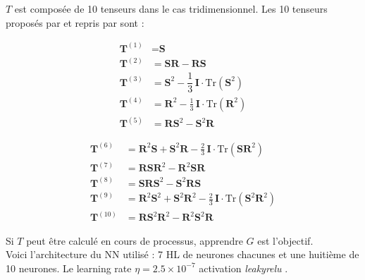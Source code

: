 \documentclass[a4paper,12pt]{report}
\newcommand\bk{\color{black}}
\newcommand\navy{\color{navy}}
\numberwithin{equation}{section} %
\begin{document}
\noindent $T$ est composée de 10 tenseurs dans le cas tridimensionnel. Les 10 tenseurs proposés par \cite{pope1975more} et repris par \cite{ling2016reynolds} sont : \setlength{\columnseprule}{0pt}
\\
\vspace{-6mm}
\begin{multicols}{2}

\begin{align*}
\textbf{T}^{(1)} &= \textbf{S} \\
\textbf{T}^{(2)} &= \textbf{S}\textbf{R} - \textbf{R}\textbf{S} \\
\textbf{T}^{(3)} &= \textbf{S}^2 - \dfrac{1}{3}\, \textbf{I} \cdot \text{Tr} \left( \textbf{S}^2 \right)\\
\textbf{T}^{(4)} &= \textbf{R}^2 - \frac{1}{3}\, \textbf{I} \cdot \text{Tr} \left( \textbf{R}^2 \right)\\
\textbf{T}^{(5)} &= \textbf{R}\textbf{S}^2 - \textbf{S}^2\textbf{R}
\end{align*}

\columnbreak

\begin{align*}
\textbf{T}^{(6)} &= \textbf{R}^2\textbf{S} + \textbf{S}^2\textbf{R} - \frac{2}{3}\, \textbf{I}\cdot \text{Tr}\left(\textbf{S}\textbf{R}^2 \right) \\
\textbf{T}^{(7)} &= \textbf{R}\textbf{S}\textbf{R}^2 - \textbf{R}^2\textbf{S}\textbf{R} \\
\textbf{T}^{(8)} &= \textbf{S}\textbf{R}\textbf{S}^2 - \textbf{S}^2\textbf{R}\textbf{S} \\
\textbf{T}^{(9)} &= \textbf{R}^2\textbf{S}^2 + \textbf{S}^2\textbf{R}^2 - \frac{2}{3}\, \textbf{I}\cdot \text{Tr}\left(\textbf{S}^2\textbf{R}^2 \right)\\
\textbf{T}^{(10)} &= \textbf{R}\textbf{S}^2\textbf{R}^2 - \textbf{R}^2\textbf{S}^2\textbf{R}
\end{align*}

\end{multicols}
\vspace{2mm}

Si $T$ peut être calculé en cours de processus, apprendre $G$ est l'objectif.\\[1mm]

 Voici l'architecture du NN utilisé : 7 HL de neurones chacunes et une huitième de 10 neurones. Le learning rate $ \eta = 2.5 \times 10^{-7}$ activation \navy \textit{leakyrelu} \bk. \\
\end{document}
